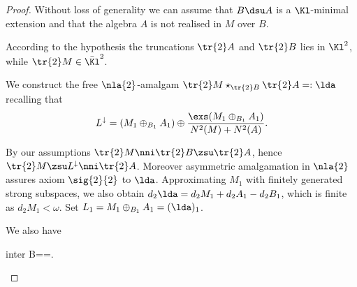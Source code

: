 \begin{proof}
Without loss of generality we can assume that $B\dsu A$ is a $\Kl$-minimal extension and
that the algebra $A$ is not realised in $M$ over $B$.



\bigskip
According to the hypothesis the truncations $\tr{2}A$ and $\tr{2}B$ lies in $\Kl^{2}$, while
$\tr{2}M\in\bar{\Kl}^{2}$.

We construct the free $\nla{2}$-amalgam $\tr{2}M\star_{\tr{2}B}\tr{2}A=:\lda$ %
recalling that
$$
L^{\downarrow}=\left(M_{1}\oplus_{B_{1}}A_{1}\right)\oplus
\frac{\exs(M_{1}\oplus_{B_{1}}A_{1})}{N^{2}(M)+N^{2}(A)}.
$$

By our assumptions $\tr{2}M\nni\tr{2}B\zsu\tr{2}A$, hence $\tr{2}M\zsu L^{\downarrow}\nni\tr{2}A$. Moreover asymmetric amalgamation in $\nla{2}$ assures axiom $\sig{2}{2}$ to $\lda$. Approximating $M_{1}$ with finitely
generated strong subspaces, we also obtain $d_{2}\lda=d_{2}M_{1}+d_{2}A_{1}-d_{2}B_{1}$, which is
finite as $d_{2}M_{1}<\omega$. Set $L_{1}=M_{1}\oplus_{B_{1}}A_{1}=(\lda)_{1}$.

We also have
\begin{labeq}{inter}
B==\cap{}.
\end{labeq}

\medskip



\end{proof}
